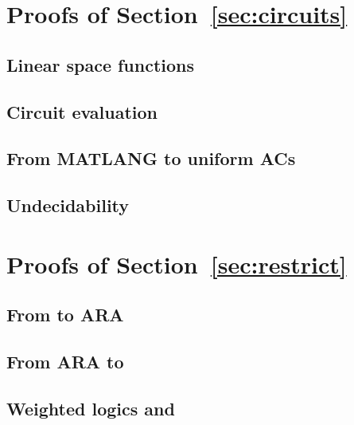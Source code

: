 \section{Proofs of Section~\ref{sec:circuits}}

% 

\subsection{Linear space functions}


\subsection{Circuit evaluation}


\subsection{From MATLANG to uniform ACs}


\subsection{Undecidability}



\section{Proofs of Section~\ref{sec:restrict}}

\subsection{From \langsum to ARA}


\subsection{From ARA to \langsum}


% 

% 

\subsection{Weighted logics and \langprod}


